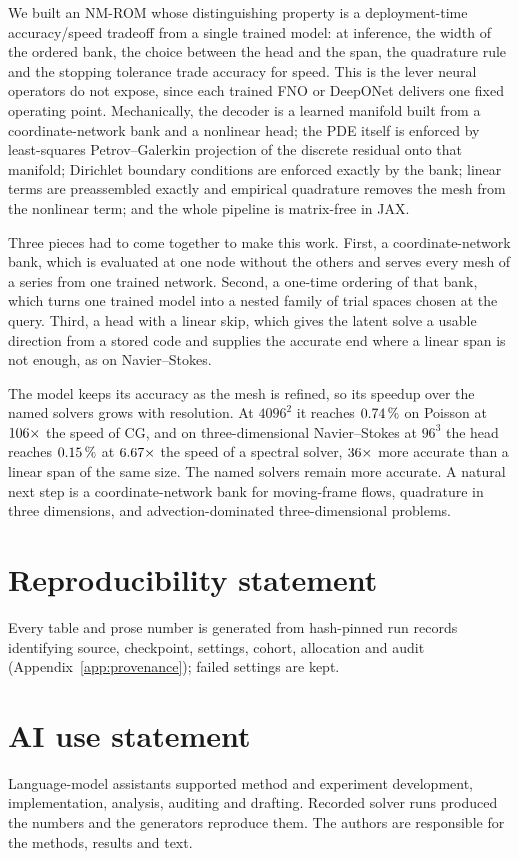 \documentclass{article}
\begin{document}
We built an NM-ROM whose distinguishing property is a deployment-time
accuracy/speed tradeoff from a single trained model: at inference, the
width of the ordered bank, the choice between the head and the span, the
quadrature rule and the stopping tolerance trade accuracy for speed. This
is the lever neural operators do not expose, since each trained FNO or
DeepONet delivers one fixed operating point. Mechanically, the decoder is
a learned manifold built from a coordinate-network bank and a nonlinear
head; the PDE itself is enforced by least-squares Petrov--Galerkin
projection of the discrete residual onto that manifold; Dirichlet
boundary conditions are enforced exactly by the bank; linear terms are
preassembled exactly and empirical quadrature removes the mesh from the
nonlinear term; and the whole pipeline is matrix-free in JAX.

Three pieces had to come together to make this work. First, a
coordinate-network bank, which is evaluated at one node without the
others and serves every mesh of a series from one trained network.
Second, a one-time ordering of that bank, which turns one trained model
into a nested family of trial spaces chosen at the query. Third, a head
with a linear skip, which gives the latent solve a usable direction from a
stored code and supplies the accurate end where a linear span is not
enough, as on Navier--Stokes.

The model keeps its accuracy as the mesh is refined, so its speedup over
the named solvers grows with resolution. At $4096^2$ it reaches
$0.74\,\%$ on Poisson at $106\times$ the speed of CG,
and on three-dimensional Navier--Stokes at $96^3$ the head reaches
$0.15\,\%$ at $6.67\times$ the speed of a spectral solver,
$36\times$ more accurate than a linear span of the same size.
The named solvers remain more accurate. A natural next step is a
coordinate-network bank for moving-frame flows, quadrature in three
dimensions, and advection-dominated three-dimensional problems.

\section*{Reproducibility statement}\label{sec:repro}
Every table and prose number is generated from hash-pinned run records
identifying source, checkpoint, settings, cohort, allocation and audit
(Appendix~\ref{app:provenance}); failed settings are kept.

\section*{AI use statement}
Language-model assistants supported method and experiment development,
implementation, analysis, auditing and drafting. Recorded solver runs
produced the numbers and the generators reproduce them. The authors are
responsible for the methods, results and text.
\end{document}
